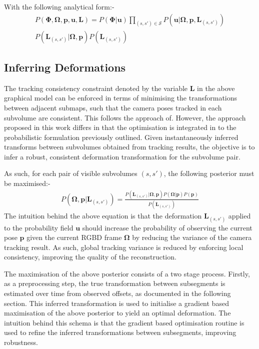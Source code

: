With the following analytical form:-
\begin{equation}
\begin{split}
P(\mathbf{\Phi}, \mathbf{\Omega}, \mathbf{p}, \mathbf{u}, \mathbf{L}) = 
P(\mathbf{\Phi}|\mathbf{u})
\prod_{(s, s') \in \mathcal{S}}P(\mathbf{u}|\mathbf{\Omega}, \mathbf{p}, \mathbf{L}_{(s, s')})\\
P(\mathbf{L}_{(s, s')}|\mathbf{\Omega}, \mathbf{p})
P(\mathbf{L}_{(s, s')})
\end{split}
\end{equation}

\subsection{Inferring Deformations}
The tracking consistency constraint denoted by the variable $\mathbf{L}$ in the above graphical model can be enforced in terms of minimising the 
transformations between adjacent submaps, such that the camera poses tracked in each subvolume are consistent. This follows the approach 
of\cite{Kahler2016}.  However, the approach proposed in this work differs in that the optimisation is integrated in to the probabilistic 
formulation previously outlined. Given instantaneously inferred transforms between subvolumes obtained from tracking results, 
the objective is to infer a robust, consistent deformation transformation for the subvolume pair.

As such, for each pair of visible subvolumes $(s, s')$, the following posterior must be maximised:-
\begin{equation}
\begin{split}
P(\mathbf{\Omega}, \mathbf{p} | \mathbf{L}_{(s, s')}) = \frac{P(\mathbf{L}_{(s, s')} | \mathbf{\Omega}, \mathbf{p}) P(\mathbf{\Omega} | \mathbf{p})P(\mathbf{p})}
{P(\mathbf{L}_{(s, s')})}
\end{split}
\end{equation}
The intuition behind the above equation is that the deformation $\mathbf{L}_{(s, s')}$ applied to the probability field $\mathbf{u}$ should 
increase the probability of observing the current pose $\mathbf{p}$ given the current RGBD frame $\mathbf{\Omega}$ by reducing the 
variance of the camera tracking result. As such, global tracking variance is reduced by enforcing local consistency, improving the quality 
of the reconstruction.

The maximisation of the above posterior consists of a two stage process. Firstly, as a preprocessing step, the true transformation between 
subsegments is estimated over time from observed offsets, as documented in the following section. This inferred transformation is used to 
initialise a gradient based maximisation of the above posterior to yield an optimal deformation. The intuition behind this schema is that the 
gradient based optimisation routine is used to refine the inferred transformations between subsegments, improving robustness.

